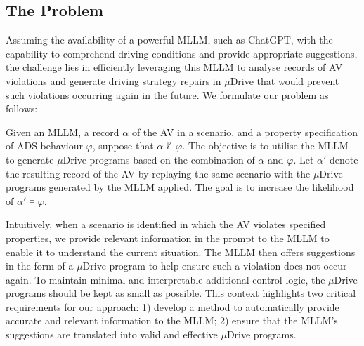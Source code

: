 \subsection{The Problem}
Assuming the availability of a powerful MLLM, such as ChatGPT, with the capability to comprehend driving conditions and provide appropriate suggestions, the challenge lies in efficiently leveraging this MLLM to analyse records of AV violations and generate driving strategy repairs in $\mu$Drive that would prevent such violations occurring again in the future.
We formulate our problem as follows:


\begin{definition}
\label{def:problem_def}
    Given an MLLM, a record $\alpha$ of the AV in a scenario, and a property specification of ADS behaviour $\varphi$, suppose that $\alpha \nvDash \varphi$.
    The objective is to utilise the MLLM to generate $\mu$Drive programs based on the combination of $\alpha$ and $\varphi$. 
    Let $\alpha'$ denote the resulting record of the AV by replaying the same scenario with the $\mu$Drive programs generated by the MLLM applied.
    The goal is to increase the likelihood of $\alpha' \vDash \varphi$.
\end{definition}



Intuitively, when a scenario is identified in which the AV violates specified properties, we provide relevant information in the prompt to the MLLM to enable it to understand the current situation. The MLLM then offers suggestions in the form of a $\mu$Drive program to help ensure such a violation does not occur again. To maintain minimal and interpretable additional control logic, the $\mu$Drive programs should be kept as small as possible.
This context highlights two critical requirements for our approach:
1) develop a method to automatically provide accurate and relevant information to the MLLM;
2) ensure that the MLLM's suggestions are translated into valid and effective $\mu$Drive programs.



